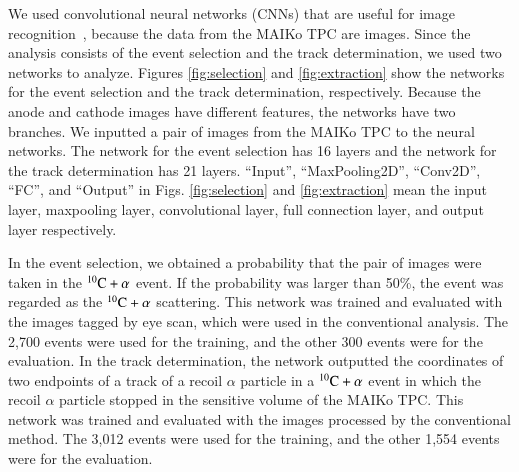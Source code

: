 \documentclass{jps-cp}
\begin{document}
We used convolutional neural networks (CNNs) that are useful for image recognition~\cite{lenet,alexnet},
because the data from the MAIKo TPC are images.
Since the analysis consists of the event selection and the track determination,
we used two networks to analyze.
Figures \ref{fig:selection} and \ref{fig:extraction} show
the networks for the event selection and the track determination, respectively.
Because the anode and cathode images have different features,
the networks have two branches.
We inputted a pair of images from the MAIKo TPC to the neural networks.
The network for the event selection has 16 layers and the network for the track determination has 21 layers.
``Input'', ``MaxPooling2D'', ``Conv2D'', ``FC'', and ``Output'' in Figs. \ref{fig:selection} and \ref{fig:extraction} mean
the input layer, maxpooling layer, convolutional layer, full connection layer, and output layer respectively.

In the event selection, we obtained a probability that the pair of images were taken
in the ${}^{10}\rm{C}+\alpha$ event.
If the probability was larger than 50\%, the event was regarded as the ${}^{10}\rm{C}+\alpha$ scattering.
This network was trained and evaluated with the images tagged by eye scan,
which were used in the conventional analysis.
The 2,700 events were used for the training, and the other 300 events were for the evaluation.
In the track determination, the network outputted the coordinates of two endpoints of
a track of a recoil $\alpha$ particle in a ${}^{10}\rm{C}+\alpha$ event in which the recoil $\alpha$ particle stopped
in the sensitive volume of the MAIKo TPC.
This network was trained and evaluated with the images processed by the conventional method.
The 3,012 events were used for the training, and the other 1,554 events were for the evaluation.
\end{document}
